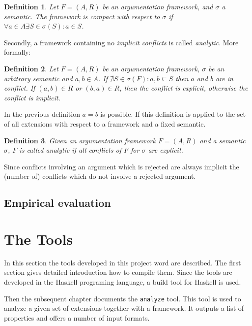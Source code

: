 \documentclass{scrartcl}
\newtheorem{definition}{Definition}
\begin{document}
\begin{definition}
Let $F=(A,R)$ be an argumentation framework, and $\sigma$ a semantic.  The
framework is \emph{compact} with respect to $\sigma$ if $\forall a\in A\exists
S\in\sigma(S):a\in S$.
\end{definition}

Secondly, a framework containing no \emph{implicit conflicts} is called
\emph{analytic}.   More formally:

\begin{definition}
  Let $F=(A,R)$ be an argumentation framework, $\sigma$ be an arbitrary semantic
  and $a, b\in A$. If $\nexists S \in \sigma(F): {a,b} \subseteq S$ then $a$ and
  $b$ are in \emph{conflict}. If $(a, b) \in R$ or $(b, a)\in R$, then the
  conflict is \emph{explicit}, otherwise the conflict is \emph{implicit}.
\end{definition}

In the previous definition $a = b$ is possible. If this definition is applied to
the set of all extensions with respect to a framework and a fixed semantic.

\begin{definition}
Given an argumentation framework $F=(A,R)$ and a semantic $\sigma$, $F$ is
called \emph{analytic} if all conflicts of $F$ for $\sigma$ are explicit.
\end{definition}

Since conflicts involving an argument which is rejected are always implicit the
(number of) conflicts which do not involve a rejected argument.

\subsection{Empirical evaluation}

\section{The Tools}
\label{tools}
In this section the tools developed in this project word are described. The
first section gives detailed introduction how to compile them. Since the tools
are developed in the Haskell programing language, a build tool for Haskell is
used.

Then the subsequent chapter documents the \texttt{analyze} tool. This tool is
used to analyze a given set of extensions together with a framework. It outputs
a list of properties and offers a number of input formats.
\end{document}
